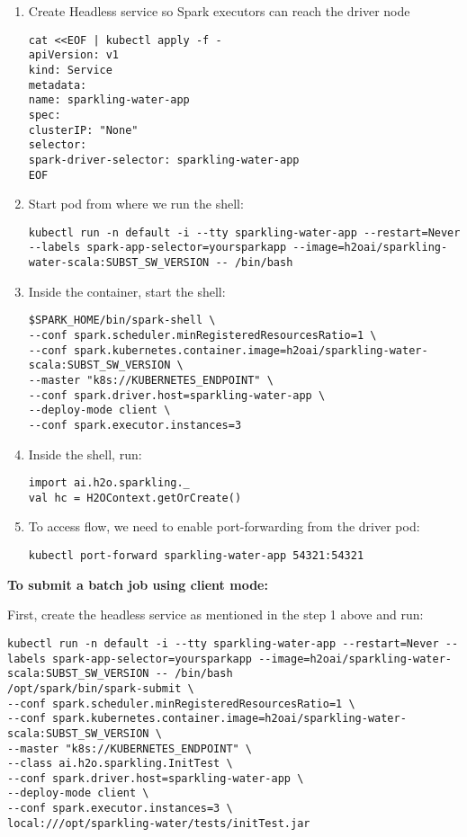 \begin{enumerate}
    \item Create Headless service so Spark executors can reach the driver node
    \begin{lstlisting}[style=Bash]
cat <<EOF | kubectl apply -f -
apiVersion: v1
kind: Service
metadata:
name: sparkling-water-app
spec:
clusterIP: "None"
selector:
spark-driver-selector: sparkling-water-app
EOF
    \end{lstlisting}
    \item Start pod from where we run the shell:
    \begin{lstlisting}[style=Bash]
kubectl run -n default -i --tty sparkling-water-app --restart=Never --labels spark-app-selector=yoursparkapp --image=h2oai/sparkling-water-scala:SUBST_SW_VERSION -- /bin/bash
    \end{lstlisting}
    \item Inside the container, start the shell:
    \begin{lstlisting}[style=Bash]
$SPARK_HOME/bin/spark-shell \
--conf spark.scheduler.minRegisteredResourcesRatio=1 \
--conf spark.kubernetes.container.image=h2oai/sparkling-water-scala:SUBST_SW_VERSION \
--master "k8s://KUBERNETES_ENDPOINT" \
--conf spark.driver.host=sparkling-water-app \
--deploy-mode client \
--conf spark.executor.instances=3
    \end{lstlisting}
    \item Inside the shell, run:
    \begin{lstlisting}[style=Scala]
import ai.h2o.sparkling._
val hc = H2OContext.getOrCreate()
    \end{lstlisting}
    \item To access flow, we need to enable port-forwarding from the driver pod:
    \begin{lstlisting}[style=Bash]
kubectl port-forward sparkling-water-app 54321:54321
    \end{lstlisting}
\end{enumerate}


\textbf{To submit a batch job using client mode:}

First, create the headless service as mentioned in the step 1 above and run:

\begin{lstlisting}[style=Bash]
kubectl run -n default -i --tty sparkling-water-app --restart=Never --labels spark-app-selector=yoursparkapp --image=h2oai/sparkling-water-scala:SUBST_SW_VERSION -- /bin/bash
/opt/spark/bin/spark-submit \
--conf spark.scheduler.minRegisteredResourcesRatio=1 \
--conf spark.kubernetes.container.image=h2oai/sparkling-water-scala:SUBST_SW_VERSION \
--master "k8s://KUBERNETES_ENDPOINT" \
--class ai.h2o.sparkling.InitTest \
--conf spark.driver.host=sparkling-water-app \
--deploy-mode client \
--conf spark.executor.instances=3 \
local:///opt/sparkling-water/tests/initTest.jar
\end{lstlisting}

